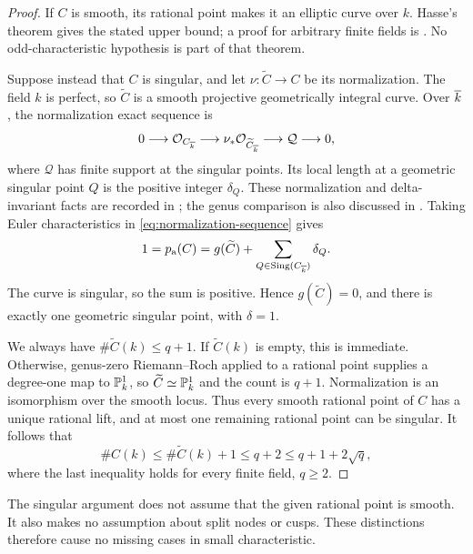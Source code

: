 \begin{proof}
If \(C\) is smooth, its rational point makes it an elliptic curve
over \(k\). Hasse's theorem gives the stated upper bound; a proof
for arbitrary finite fields is \citet[Theorem 7.3]{Sutherland2021}.
No odd-characteristic hypothesis is part of that theorem.

Suppose instead that \(C\) is singular, and let
\(\nu:\widetilde C\to C\) be its normalization. The field
\(k\) is perfect, so \(\widetilde C\) is a smooth projective
geometrically integral curve. Over \(\overline{k}\), the normalization
exact sequence is
\begin{equation}\label{eq:normalization-sequence}
0\longrightarrow\mathcal O_{C_{\overline{k}}}
\longrightarrow\nu_*\mathcal O_{\widetilde C_{\overline{k}}}
\longrightarrow\mathcal Q\longrightarrow0,
\end{equation}
where \(\mathcal Q\) has finite support at the singular points.
Its local length at a geometric singular point \(Q\) is the
positive integer \(\delta_Q\). These normalization and
delta-invariant facts are recorded in
\citet[\href{https://stacks.math.columbia.edu/tag/0C3Q}{Tag 0C3Q},
Lemmas 33.39.2--33.39.4]{stacks-project}; the genus comparison is
also discussed in
\citet[\href{https://stacks.math.columbia.edu/tag/0CE0}{Tag 0CE0}]{stacks-project}.
Taking Euler characteristics in \eqref{eq:normalization-sequence}
gives
\begin{equation}\label{eq:delta-genus}
1=p_{\mathrm a}(C)=g(\widetilde C)+
\sum_{Q\in\operatorname{Sing}(C_{\overline{k}})}\delta_Q.
\end{equation}
The curve is singular, so the sum is positive. Hence
\(g(\widetilde C)=0\), and there is exactly one geometric
singular point, with \(\delta=1\).

We always have \(\#\widetilde C(k)\le q+1\). If
\(\widetilde C(k)\) is empty, this is immediate. Otherwise,
genus-zero Riemann--Roch applied to a rational point supplies a
degree-one map to \(\mathbb P^1_k\), so
\(\widetilde C\simeq\mathbb P^1_k\) and the count is \(q+1\).
Normalization is an isomorphism over the smooth locus. Thus every
smooth rational point of \(C\) has a unique rational lift, and
at most one remaining rational point can be singular. It follows that
\begin{equation}\label{eq:singular-bound}
\#C(k)\le\#\widetilde C(k)+1\le q+2
\le q+1+2\sqrt q,
\end{equation}
where the last inequality holds for every finite field, \(q\ge2\).
\end{proof}

The singular argument does not assume that the given rational point
is smooth. It also makes no assumption about split nodes or cusps.
These distinctions therefore cause no missing cases in small
characteristic.

